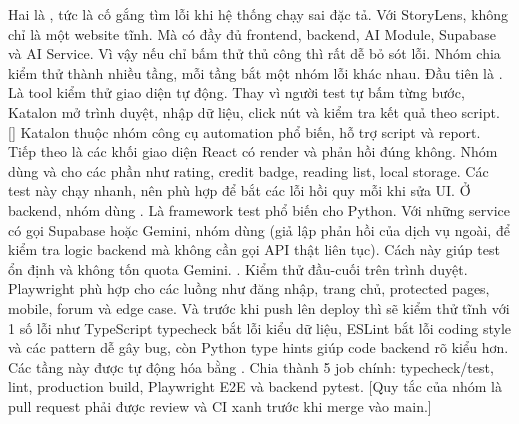 \markdownRendererUlItem Hai là , tức là cố gắng tìm lỗi khi hệ thống chạy sai đặc tả.\markdownRendererUlItemEnd 
\markdownRendererUlEndTight \markdownRendererInterblockSeparator
{}Với StoryLens, không chỉ là một website tĩnh. Mà có đầy đủ frontend, backend, AI Module, Supabase và AI Service. Vì vậy nếu chỉ bấm thử thủ công thì rất dễ bỏ sót lỗi. Nhóm chia kiểm thử thành nhiều tầng, mỗi tầng bắt một nhóm lỗi khác nhau.\markdownRendererParagraphSeparator
{}Đầu tiên là . Là tool kiểm thử giao diện tự động. Thay vì người test tự bấm từng bước, Katalon mở trình duyệt, nhập dữ liệu, click nút và kiểm tra kết quả theo script.\markdownRendererParagraphSeparator
{}[] Katalon thuộc nhóm công cụ automation phổ biến, hỗ trợ script và report.\markdownRendererParagraphSeparator
{}Tiếp theo là  các khối giao diện React có render và phản hồi đúng không. Nhóm dùng  và  cho các phần như rating, credit badge, reading list, local storage. Các test này chạy nhanh, nên phù hợp để bắt các lỗi hồi quy mỗi khi sửa UI.\markdownRendererParagraphSeparator
{}Ở backend, nhóm dùng . Là framework test phổ biến cho Python. Với những service có gọi Supabase hoặc Gemini, nhóm dùng  (giả lập phản hồi của dịch vụ ngoài, để kiểm tra logic backend mà không cần gọi API thật liên tục). Cách này giúp test ổn định và  không tốn quota Gemini.\markdownRendererParagraphSeparator
{}. Kiểm thử đầu-cuối trên trình duyệt. Playwright phù hợp cho các luồng như đăng nhập, trang chủ, protected pages, mobile, forum và edge case.\markdownRendererParagraphSeparator
{}Và trước khi push lên deploy thì sẽ kiểm thử tĩnh với 1 số lỗi như TypeScript typecheck bắt lỗi kiểu dữ liệu, ESLint bắt lỗi coding style và các pattern dễ gây bug, còn Python type hints giúp code backend rõ kiểu hơn.\markdownRendererParagraphSeparator
{}Các tầng này được tự động hóa bằng . Chia thành  5 job chính: typecheck/test, lint, production build, Playwright E2E và backend pytest.\markdownRendererParagraphSeparator
{}[Quy tắc của nhóm là pull request phải được review và CI xanh trước khi merge vào main.]\markdownRendererParagraphSeparator
